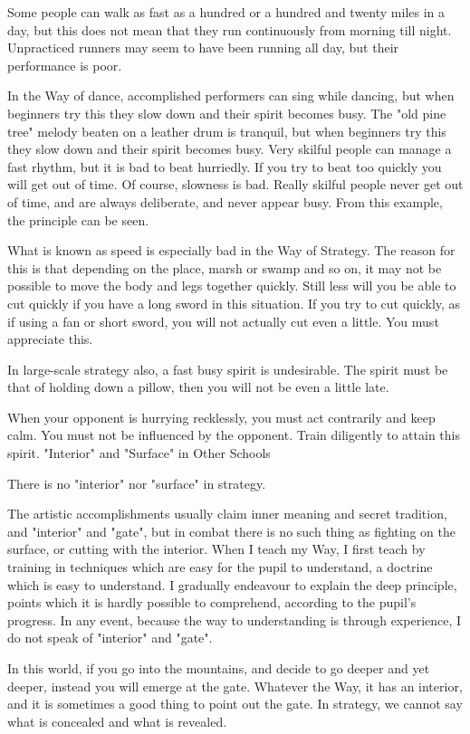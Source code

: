 Some people can walk as fast as a hundred or a hundred and twenty miles in a day, but this does not mean that they run continuously from morning till night. Unpracticed runners may seem to have been running all day, but their performance is poor.

In the Way of dance, accomplished performers can sing while dancing, but when beginners try this they slow down and their spirit becomes busy. The "old pine tree" melody beaten on a leather drum is tranquil, but when beginners try this they slow down and their spirit becomes busy. Very skilful people can manage a fast rhythm, but it is bad to beat hurriedly. If you try to beat too quickly you will get out of time. Of course, slowness is bad. Really skilful people never get out of time, and are always deliberate, and never appear busy. From this example, the principle can be seen.

What is known as speed is especially bad in the Way of Strategy. The reason for this is that depending on the place, marsh or swamp and so on, it may not be possible to move the body and legs together quickly. Still less will you be able to cut quickly if you have a long sword in this situation. If you try to cut quickly, as if using a fan or short sword, you will not actually cut even a little. You must appreciate this.

In large-scale strategy also, a fast busy spirit is undesirable. The spirit must be that of holding down a pillow, then you will not be even a little late.

When your opponent is hurrying recklessly, you must act contrarily and keep calm. You must not be influenced by the opponent. Train diligently to attain this spirit.
"Interior" and "Surface" in Other Schools

There is no "interior" nor "surface" in strategy.

The artistic accomplishments usually claim inner meaning and secret tradition, and "interior" and "gate", but in combat there is no such thing as fighting on the surface, or cutting with the interior. When I teach my Way, I first teach by training in techniques which are easy for the pupil to understand, a doctrine which is easy to understand. I gradually endeavour to explain the deep principle, points which it is hardly possible to comprehend, according to the pupil's progress. In any event, because the way to understanding is through experience, I do not speak of "interior" and "gate".

In this world, if you go into the mountains, and decide to go deeper and yet deeper, instead you will emerge at the gate. Whatever the Way, it has an interior, and it is sometimes a good thing to point out the gate. In strategy, we cannot say what is concealed and what is revealed.

